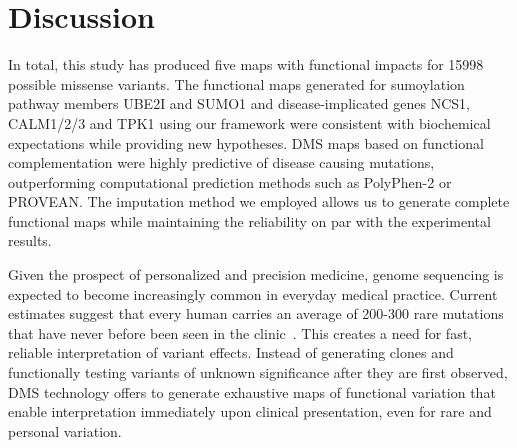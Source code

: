 \section{Discussion}
\label{ch2discussion}

In total, this study has produced five maps with functional impacts for 15998 possible missense variants. The functional maps generated for sumoylation pathway members UBE2I and SUMO1 and disease-implicated genes NCS1, CALM1/2/3 and TPK1 using our framework were consistent with biochemical expectations while providing new hypotheses. DMS maps based on functional complementation were highly predictive of disease causing mutations, outperforming computational prediction methods such as PolyPhen-2 or PROVEAN.  The imputation method we employed allows us to generate complete functional maps while maintaining the reliability on par with the experimental results. 

Given the prospect of personalized and precision medicine, genome sequencing is expected to become increasingly common in everyday medical practice. Current estimates suggest that every human carries an average of 200-300 rare mutations that have never before been seen in the clinic~\cite{the_1000_genomes_project_consortium_global_2015}. This creates a need for fast, reliable interpretation of variant effects. Instead of generating clones and functionally testing variants of unknown significance after they are first observed, DMS technology offers to generate exhaustive maps of functional variation that enable interpretation immediately upon clinical presentation, even for rare and personal variation.

